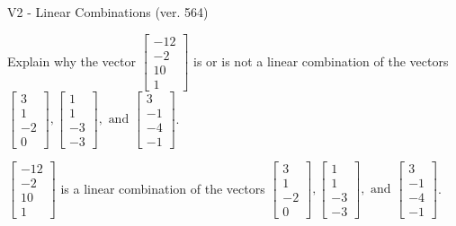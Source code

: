 \begin{exercise}
  \begin{exerciseTitle}V2 - Linear Combinations (ver. 564)\end{exerciseTitle}
  \begin{exerciseStatement}
    Explain why the vector \(\left[\begin{array}{c}
-12 \\
-2 \\
10 \\
1
\end{array}\right]\)  is or is not a linear 
	combination of the vectors \(\left[\begin{array}{c}
3 \\
1 \\
-2 \\
0
\end{array}\right] , \left[\begin{array}{c}
1 \\
1 \\
-3 \\
-3
\end{array}\right] , \text{ and } \left[\begin{array}{c}
3 \\
-1 \\
-4 \\
-1
\end{array}\right]\).
	


  \end{exerciseStatement}
  \begin{exerciseAnswer}
   \(\left[\begin{array}{c}
-12 \\
-2 \\
10 \\
1
\end{array}\right]\) 
  	 is  
	a linear combination of the vectors \(\left[\begin{array}{c}
3 \\
1 \\
-2 \\
0
\end{array}\right] , \left[\begin{array}{c}
1 \\
1 \\
-3 \\
-3
\end{array}\right] , \text{ and } \left[\begin{array}{c}
3 \\
-1 \\
-4 \\
-1
\end{array}\right]\).

	
  


  \end{exerciseAnswer}
\end{exercise}